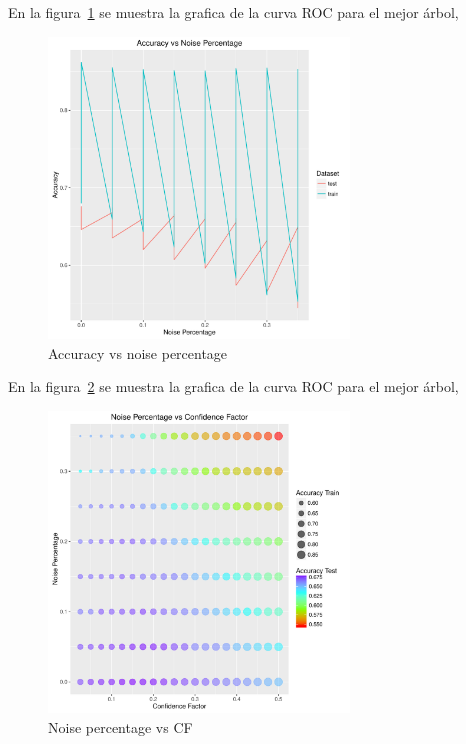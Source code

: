 En la figura~\ref{fig:5c} se muestra la grafica de la curva ROC para el mejor árbol,

\begin{figure}
  \centering
  \includegraphics[width = 8cm]{5c.pdf}
  \caption{Accuracy vs noise percentage}
  \label{fig:5c}
\end{figure}

En la figura~\ref{fig:5d} se muestra la grafica de la curva ROC para el mejor árbol,

\begin{figure}
  \centering
  \includegraphics[width = 8cm]{5d.pdf}
  \caption{Noise percentage vs CF}
  \label{fig:5d}
\end{figure}

